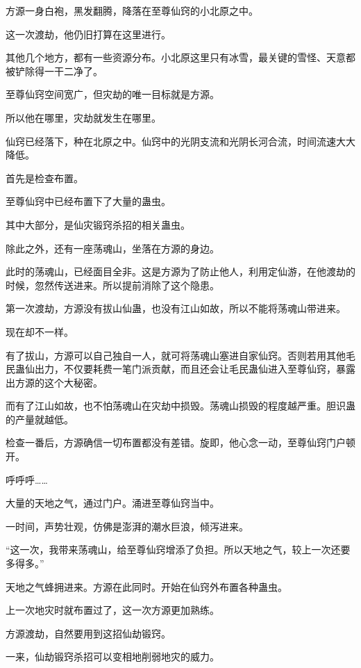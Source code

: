 
\begin{this_body}

方源一身白袍，黑发翻腾，降落在至尊仙窍的小北原之中。

这一次渡劫，他仍旧打算在这里进行。

其他几个地方，都有一些资源分布。小北原这里只有冰雪，最关键的雪怪、天意都被铲除得一干二净了。

至尊仙窍空间宽广，但灾劫的唯一目标就是方源。

所以他在哪里，灾劫就发生在哪里。

仙窍已经落下，种在北原之中。仙窍中的光阴支流和光阴长河合流，时间流速大大降低。

首先是检查布置。

至尊仙窍中已经布置下了大量的蛊虫。

其中大部分，是仙灾锻窍杀招的相关蛊虫。

除此之外，还有一座荡魂山，坐落在方源的身边。

此时的荡魂山，已经面目全非。这是方源为了防止他人，利用定仙游，在他渡劫的时候，忽然传送进来。所以提前消除了这个隐患。

第一次渡劫，方源没有拔山仙蛊，也没有江山如故，所以不能将荡魂山带进来。

现在却不一样。

有了拔山，方源可以自己独自一人，就可将荡魂山塞进自家仙窍。否则若用其他毛民蛊仙出力，不仅要耗费一笔门派贡献，而且还会让毛民蛊仙进入至尊仙窍，暴露出方源的这个大秘密。

而有了江山如故，也不怕荡魂山在灾劫中损毁。荡魂山损毁的程度越严重。胆识蛊的产量就越低。

检查一番后，方源确信一切布置都没有差错。旋即，他心念一动，至尊仙窍门户顿开。

呼呼呼……

大量的天地之气，通过门户。涌进至尊仙窍当中。

一时间，声势壮观，仿佛是澎湃的潮水巨浪，倾泻进来。

“这一次，我带来荡魂山，给至尊仙窍增添了负担。所以天地之气，较上一次还要多得多。”

天地之气蜂拥进来。方源在此同时。开始在仙窍外布置各种蛊虫。

上一次地灾时就布置过了，这一次方源更加熟练。

方源渡劫，自然要用到这招仙劫锻窍。

一来，仙劫锻窍杀招可以变相地削弱地灾的威力。


\end{this_body}
